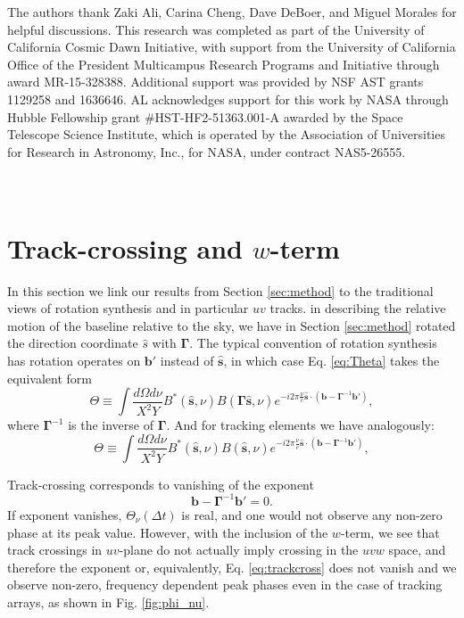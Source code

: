 \documentclass[twocolumn,apj,numberedappendix]{emulateapj}
\renewcommand\[{\begin{equation}}
\renewcommand\]{\end{equation}}
\begin{document}
\acknowledgments

The authors thank Zaki Ali, Carina Cheng, Dave DeBoer, and Miguel Morales for helpful discussions. This research was completed as part of the University of California Cosmic Dawn Initiative, with support from the University of California Office of the President Multicampus Research Programs and Initiative through award MR-15-328388. Additional support was provided by NSF AST grants 1129258 and 1636646. AL acknowledges support for this work by NASA through Hubble Fellowship grant \#HST-HF2-51363.001-A awarded by the Space Telescope Science Institute, which is operated by the Association of Universities for Research in Astronomy, Inc., for NASA, under contract NAS5-26555.




\appendix
\section{\\Track-crossing and $w$-term \label{sec:appA}}
\label{sec:appA}
In this section we link our results from Section \ref{sec:method} to the traditional views of rotation synthesis and in particular $uv$ tracks. in describing the relative motion of the baseline relative to the sky, we have in Section \ref{sec:method} rotated the direction coordinate $\hat{s}$ with $\boldsymbol{\Gamma}$. 
The typical convention of rotation synthesis has rotation operates on $\boldsymbol{b'}$ instead of $\hat{\boldsymbol{s}}$, in which case Eq. \eqref{eq:Theta} takes the equivalent form
\begin{equation}
\Theta \equiv\int\frac{d\Omega d\nu}{X^{2}Y}B^{*}(\hat{\boldsymbol{s}},\nu)B(\boldsymbol{\Gamma}\hat{\boldsymbol{s}},\nu) e^{-i2\pi\frac{\nu}{c}\hat{\boldsymbol{s}}\cdot\left(\boldsymbol{b}-\boldsymbol{\Gamma}^{-1}\boldsymbol{b'}\right)}, 
\label{eq:drift}
\end{equation}
where $\boldsymbol{\Gamma}^{-1}$ is the inverse of $\boldsymbol{\Gamma}$. 
And for tracking elements we have analogously:
\begin{equation}
\Theta \equiv\int\frac{d\Omega d\nu}{X^{2}Y}B^{*}(\hat{\boldsymbol{s}},\nu)B(\hat{\boldsymbol{s}},\nu) e^{-i2\pi\frac{\nu}{c}\hat{\boldsymbol{s}}\cdot\left(\boldsymbol{b}-\boldsymbol{\Gamma}^{-1}\boldsymbol{b'}\right)}, 
\label{eq:tracking}
\end{equation}

Track-crossing corresponds to vanishing of the exponent
\[
 \boldsymbol{b}-\boldsymbol{\Gamma}^{-1}\boldsymbol{b'} = 0. \label{eq:trackcross}
 \]
If exponent vanishes, $\Theta_{\nu}(\Delta t)$ is real, and one would not observe any non-zero phase at its peak value. However, with the inclusion of the $w$-term, we see that track crossings in $uv$-plane do not actually imply crossing in the $uvw$ space, and therefore the exponent or, equivalently, Eq. \eqref{eq:trackcross} does not vanish and we observe non-zero, frequency dependent peak phases even in the case of tracking arrays, as shown in Fig. \ref{fig:phi_nu}. 
\end{document}
